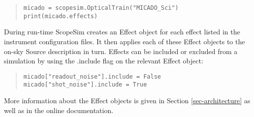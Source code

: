 \begin{quote}
\begin{alltt}
\begin{minipage}[c]{0.95\textwidth}
\begin{lstlisting}[frame=single]
micado = scopesim.OpticalTrain("MICADO_Sci")
print(micado.effects)
\end{lstlisting}
\end{minipage}
\end{alltt}
\end{quote}

During run-time ScopeSim creates an Effect object for each effect listed in the instrument configuration files.
It then applies each of these Effect objects to the on-sky Source description in turn.
Effects can be included or excluded from a simulation by using the \textquotedbl{}.include\textquotedbl{} flag on the relevant Effect object:

\begin{quote}
\begin{alltt}
\begin{minipage}[c]{0.95\textwidth}
\begin{lstlisting}[frame=single]
micado["readout_noise"].include = False
micado["shot_noise"].include = True
\end{lstlisting}
\end{minipage}
\end{alltt}
\end{quote}

More information about the Effect objects is given in Section \ref{sec-architecture} as well as in the online documentation.
